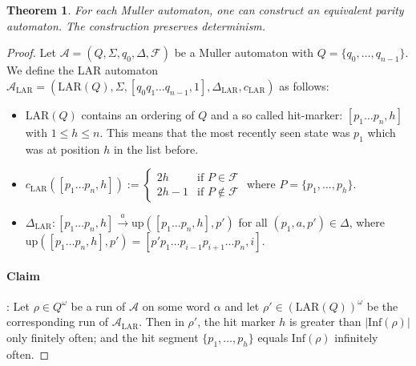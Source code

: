 \documentclass{article}
\newtheorem{theorem}{Theorem}
\begin{document}
\vspace{1cm}
\begin{theorem}
\label{muller_to_parity}
	For each Muller automaton, one can construct an equivalent parity automaton. The construction preserves determinism.
\end{theorem}
\begin{proof}
	Let $\mathcal{A} = (Q, \Sigma, q_0, \Delta, \mathcal{F})$ be a Muller automaton with $Q = \{q_0, \dots, q_{n-1}\}$. We define the LAR automaton $\mathcal{A}_\text{LAR} = (\text{LAR}(Q), \Sigma, [q_0 q_1 \dots q_{n-1}, 1], \Delta_\text{LAR}, c_\text{LAR})$ as follows:
	\begin{itemize}
		\item $\text{LAR}(Q)$ contains an ordering of $Q$ and a so called hit-marker: $[p_1 \dots p_n, h]$ with $1 \leq h \leq n$. This means that the most recently seen state was $p_1$ which was at position $h$ in the list before.
		\item $c_\text{LAR}([p_1 \dots p_n, h]) := \begin{cases}
			2h & \text{if } P \in \mathcal{F} \\
			2h-1 & \text{if } P \notin \mathcal{F}
		\end{cases}$ where $P = \{p_1, \dots, p_h\}$.
		\item $\Delta_\text{LAR} : [p_1 \dots p_n, h] \overset{a}{\rightarrow} \text{up}([p_1 \dots p_n, h], p')$ for all $(p_1, a, p') \in \Delta$, where $\text{up}([p_1 \dots p_n, h], p') = [p' p_1 \dots p_{i-1} p_{i+1} \dots p_n, i]$.
	\end{itemize}
	
	\paragraph{Claim}: Let $\rho \in Q^\omega$ be a run of $\mathcal{A}$ on some word $\alpha$ and let $\rho' \in (\text{LAR}(Q))^\omega$ be the corresponding run of $\mathcal{A}_\text{LAR}$. Then in $\rho'$, the hit marker $h$ is greater than $|\text{Inf}(\rho)|$ only finitely often; and the hit segment $\{p_1, \dots, p_h\}$ equals $\text{Inf}(\rho)$ infinitely often.
\end{proof}
\end{document}
